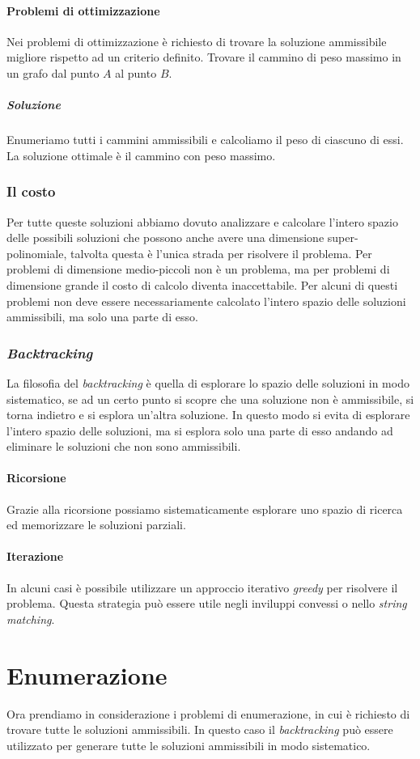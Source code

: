     \paragraph{Problemi di ottimizzazione} Nei problemi di ottimizzazione è richiesto di trovare la soluzione ammissibile migliore rispetto ad un criterio definito. Trovare il cammino di peso massimo in un grafo dal punto $A$ al punto $B$.
        \subparagraph{Soluzione} Enumeriamo tutti i cammini ammissibili e calcoliamo il peso di ciascuno di essi. La soluzione ottimale è il cammino con peso massimo.
    \subsubsection{Il costo}
        Per tutte queste soluzioni abbiamo dovuto analizzare e calcolare l'intero spazio delle possibili soluzioni che possono anche avere una dimensione super-polinomiale, talvolta questa è l'unica strada per risolvere il problema. Per problemi di dimensione medio-piccoli non è un problema, ma per problemi di dimensione grande il costo di calcolo diventa inaccettabile. Per alcuni di questi problemi non deve essere necessariamente calcolato l'intero spazio delle soluzioni ammissibili, ma solo una parte di esso. 
    \subsubsection{\textit{Backtracking}}
        La filosofia del \textit{backtracking} è quella di esplorare lo spazio delle soluzioni in modo sistematico, se ad un certo punto si scopre che una soluzione non è ammissibile, si torna indietro e si esplora un'altra soluzione. In questo modo si evita di esplorare l'intero spazio delle soluzioni, ma si esplora solo una parte di esso andando ad eliminare le soluzioni che non sono ammissibili.
        \paragraph{Ricorsione} Grazie alla ricorsione possiamo sistematicamente esplorare uno spazio di ricerca ed memorizzare le soluzioni parziali.
        \paragraph{Iterazione} In alcuni casi è possibile utilizzare un approccio iterativo \textit{greedy} per risolvere il problema. Questa strategia può essere utile negli inviluppi convessi o nello \textit{string matching}.
\section{Enumerazione}
    Ora prendiamo in considerazione i problemi di enumerazione, in cui è richiesto di trovare tutte le soluzioni ammissibili. In questo caso il \textit{backtracking} può essere utilizzato per generare tutte le soluzioni ammissibili in modo sistematico.
